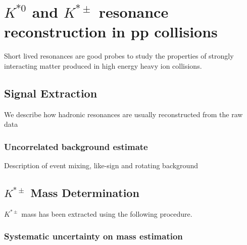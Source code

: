 \chapter{$K^{*0}$ and $K^{*\pm}$ resonance reconstruction in pp collisions}
\label{cap:4}


\vspace*{2cm}
Short lived resonances are good probes to study the properties of strongly interacting matter produced in high energy heavy ion collisions.


\section{Signal Extraction}
\label{cap:4.1}
We describe how hadronic resonances are usually reconstructed from the raw data

\subsection{Uncorrelated background estimate}
\label{cap:4.1a}
Description of event mixing, like-sign and rotating background


\section{$K^{*\pm}$ Mass Determination}
\label{cap:4.2}
$K^{*\pm}$ mass has been extracted using the following procedure.

\subsection{Systematic uncertainty on mass estimation}
\label{cap:4.2a}